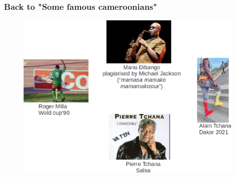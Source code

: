 \documentclass[xcolor=table,bigger,unknownkeysallowed]{beamer}
\begin{document}
        \begin{frame}
        \frametitle{Back to "Some famous cameroonians"} 
 		    \begin{figure}
			\centering
	\includegraphics[width=.7\columnwidth]{fig/famous}
			\end{figure}			
        \end{frame}                       
\end{document}
